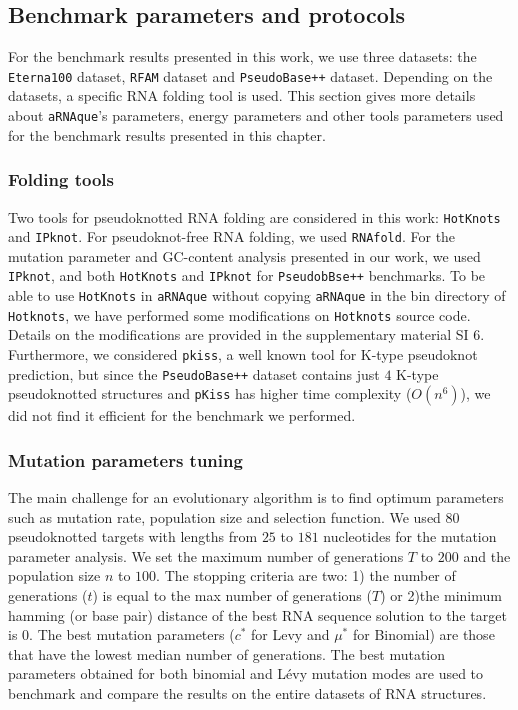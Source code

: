 \subsection{Benchmark parameters and protocols}
For the benchmark results presented in this work, we use three datasets: the \texttt{Eterna100} dataset, \texttt{RFAM} dataset and \texttt{PseudoBase++} dataset. Depending on the datasets, a specific RNA folding tool is used. This section gives more details about \texttt{aRNAque}'s parameters, energy parameters and other tools parameters used for the benchmark results presented in this chapter. 
\subsubsection*{Folding tools}
Two tools for pseudoknotted RNA folding are considered in this work: \texttt{HotKnots} and \texttt{IPknot}. For pseudoknot-free RNA folding, we used \texttt{RNAfold}.
 For the mutation parameter and GC-content analysis presented in our work, we used \texttt{IPknot}, and both \texttt{HotKnots} and \texttt{IPknot} for \texttt{PseudobBse++} benchmarks. To be able to use \texttt{HotKnots} in \texttt{aRNAque} without copying \texttt{aRNAque} in the bin directory of \texttt{Hotknots}, we have performed some modifications on \texttt{Hotknots} source code. Details on the modifications are provided in the supplementary material SI 6. Furthermore, we considered \texttt{pkiss}, a well known tool for K-type pseudoknot prediction, but since the \texttt{PseudoBase++} dataset contains just $4$ K-type pseudoknotted structures and \texttt{pKiss} has higher time complexity ($O(n^6)$), we did not find it efficient for the benchmark we performed.
\subsubsection*{Mutation parameters tuning}
The main challenge for an evolutionary algorithm is to find optimum parameters such as mutation rate, population size and selection function.
We used $80$ pseudoknotted targets with lengths from $25$ to $181$ nucleotides for the mutation parameter analysis. We set the maximum number of generations $T$ to $200$ and the population size $n$ to $100$. The stopping criteria are two: 1) the number of generations ($t$) is equal to the max number of generations ($T$) or 2)the minimum hamming (or base pair) distance of the best RNA sequence solution to the target is $0$. The best mutation parameters ($c^*$ for Levy and $\mu^*$ for Binomial) are those that have the lowest median number of generations. The best mutation parameters obtained for both binomial and Lévy mutation modes are used to benchmark and compare the results on the entire datasets of RNA structures.
